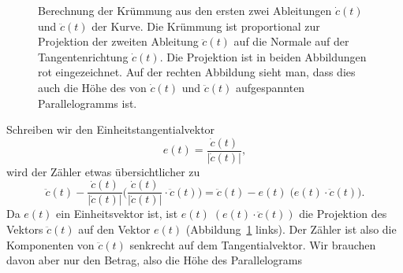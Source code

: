 \begin{figure}[t!]
\centering
{}
\hfill
{}
\caption{Berechnung der Krümmung aus den ersten zwei Ableitungen
$\dot c(t)$ und $\ddot c(t)$ der Kurve.
Die Krümmung ist proportional zur Projektion der zweiten Ableitung
$\ddot c(t)$ auf die Normale auf der Tangentenrichtung $\dot c(t)$.
Die Projektion ist in beiden Abbildungen {\color{red}rot} eingezeichnet.
Auf der rechten Abbildung sieht man, dass dies auch die Höhe des
von $\dot c(t)$ und $\ddot c(t)$ aufgespannten Parallelogramms ist.
\label{skript:chapter:kruemmungsberechnung}}
\end{figure}
Schreiben wir den Einheitstangentialvektor
\[
e(t)= \frac{\dot c(t)}{|\dot c(t)|},
\]
wird der Zähler etwas übersichtlicher zu
\[
\ddot c(t) - \frac{\dot c(t)}{|\dot c(t)|} \biggl( \frac{\dot c(t)}{|\dot c(t)|}\cdot \ddot c(t)\biggr)
=
\ddot c(t) - e(t)\; \bigl(e(t)\cdot \ddot c(t)\bigr).
\]
Da $e(t)$ ein Einheitsvektor ist, ist
$e(t) \;(e(t)\cdot\ddot c(t))$ die Projektion des Vektors
$\ddot c(t)$ auf den Vektor $e(t)$
(Abbildung~\ref{skript:chapter:kruemmungsberechnung} links).
Der Zähler ist also die Komponenten von $\ddot c(t)$ senkrecht auf dem
Tangentialvektor.
Wir brauchen davon aber nur den Betrag, also die Höhe des Parallelograms

